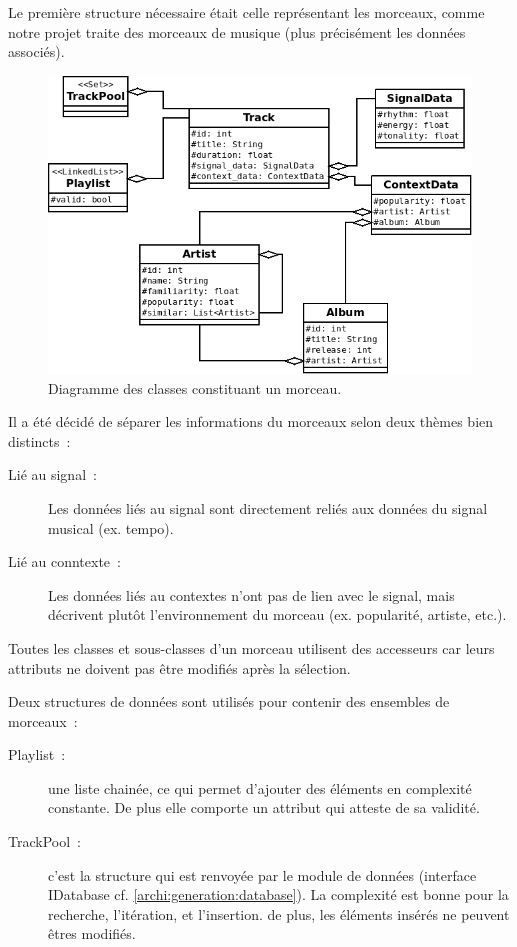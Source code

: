 Le première structure nécessaire était celle représentant les morceaux, comme
notre projet traite des morceaux de musique (plus précisément les données
associés).

\begin{figure}[H]
\includegraphics[width=\textwidth]{data/archi/track.png}
\caption{Diagramme des classes constituant un morceau.}
\end{figure}

Il a été décidé de séparer les informations du morceaux selon deux  thèmes bien
distincts~:
\begin{description}
  \item[Lié au signal~:] Les données liés au signal sont directement reliés
  aux données du signal musical (ex. tempo).
  \item[Lié au conntexte~:] Les données liés au contextes n'ont pas de lien avec
  le signal, mais décrivent plutôt l'environnement du morceau (ex. popularité,
  artiste, etc.).
\end{description}

Toutes les classes et sous-classes d'un morceau utilisent des accesseurs car leurs attributs ne doivent pas être modifiés après la sélection.

Deux structures de données sont utilisés pour contenir des ensembles de
morceaux~:
\begin{description}
  \item[Playlist~:] une liste chainée, ce qui permet d'ajouter des éléments en
  complexité constante. De plus elle comporte un attribut qui atteste de sa validité.

  \item[TrackPool~:] c'est la structure qui est renvoyée par le module de données (interface IDatabase cf. \ref{archi:generation:database}). La
  complexité est bonne pour la recherche, l’itération, et l'insertion. de plus,
  les éléments insérés ne peuvent êtres modifiés.
\end{description}

